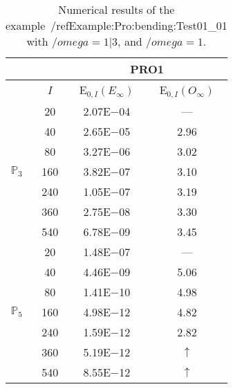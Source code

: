 \begin{table}[H]
\caption{Numerical results of the example~/ref{Example:Pro:bending:Test01_01} with $/omega=1|3$, and $/omega=1$.}
\setlength{\tabcolsep}{5pt}
\centering
\begin{tabular}{@{}l c c c@{}}
\toprule
 &  & \multicolumn{2}{c}{PRO1}\\
\midrule
 & $I$ & E$_{0,I}(E_{\infty})$ & E$_{0,I}(O_{\infty})$\\
\midrule
\multirow{7}{*}{$\mathbb{P}_{3}$}
 & 20 & 2.07E$-$04 & ---\\
 & 40 & 2.65E$-$05 & 2.96\\
 & 80 & 3.27E$-$06 & 3.02\\
 & 160 & 3.82E$-$07 & 3.10\\
 & 240 & 1.05E$-$07 & 3.19\\
 & 360 & 2.75E$-$08 & 3.30\\
 & 540 & 6.78E$-$09 & 3.45\\
\midrule
\multirow{7}{*}{$\mathbb{P}_{5}$}
 & 20 & 1.48E$-$07 & ---\\
 & 40 & 4.46E$-$09 & 5.06\\
 & 80 & 1.41E$-$10 & 4.98\\
 & 160 & 4.98E$-$12 & 4.82\\
 & 240 & 1.59E$-$12 & 2.82\\
 & 360 & 5.19E$-$12 & $\uparrow$\\
 & 540 & 8.55E$-$12 & $\uparrow$\\
\bottomrule
\end{tabular}
\label{Table:PRO:test_01_01_test6_pro1}
\end{table}
